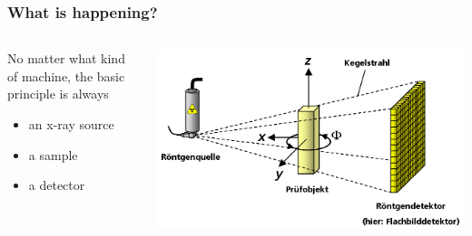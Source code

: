 \renewcommand{\imagewidth}{\linewidth}
\begin{frame}
  \frametitle{What is happening?}
  \begin{columns}[onlytextwidth]
    \begin{column}{0.5\linewidth}%
      No matter what kind of machine, the basic principle is always
      \begin{itemize}
        \item an x-ray source
        \item a sample
        \item a detector
      \end{itemize}
    \end{column}%
    \begin{column}{0.5\linewidth}%
      \centering%
      \includegraphics[width=\imagewidth]{./images/3D_Computed_Tomography}%
    \end{column}%
  \end{columns}%
\end{frame}


